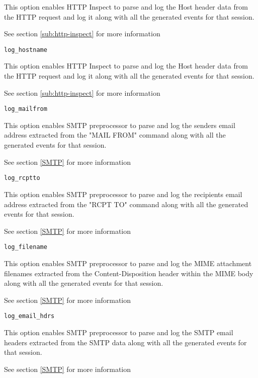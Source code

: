 \documentclass[english]{report}
\begin{document}
This option enables HTTP Inspect to parse and log the Host header
data from the HTTP request and log it along with all the generated
events for that session.

See section \ref{sub:http-inspect} for more information

\begin{verbatim}
log_hostname 
\end{verbatim}

This option enables HTTP Inspect to parse and log the Host header
data from the HTTP request and log it along with all the generated
events for that session.

See section \ref{sub:http-inspect} for more information

\begin{verbatim}
log_mailfrom
\end{verbatim}

This option enables SMTP preprocessor to parse and log the senders
email address extracted from the "MAIL FROM" command along with
all the generated events for that session.

See section \ref{SMTP} for more information

\begin{verbatim}
log_rcptto
\end{verbatim}

This option enables SMTP preprocessor to parse and log the
recipients email address extracted from the "RCPT TO" command
along with all the generated events for that session.

See section \ref{SMTP} for more information

\begin{verbatim}
log_filename
\end{verbatim}

This option enables SMTP preprocessor to parse and log the MIME
attachment filenames extracted from the Content-Disposition header
within the MIME body along with all the generated events for that
session.

See section \ref{SMTP} for more information

\begin{verbatim}
log_email_hdrs
\end{verbatim}

This option enables SMTP preprocessor to parse and log the SMTP
email headers extracted from the SMTP data along with all the
generated events for that session.

See section \ref{SMTP} for more information
\end{document}
